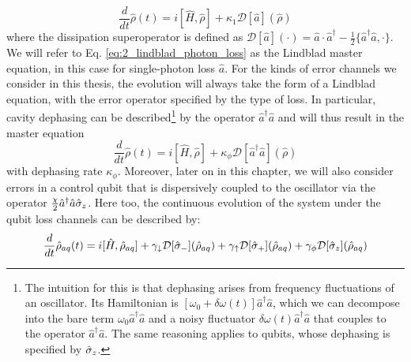 \begin{equation}
    \frac{d}{dt}\hat{\rho}(t) = i[\hat{H}, \hat{\rho}] + \kappa_1\mathcal{D}[\hat{a}](\hat{\rho})
    \label{eq:2_lindblad_photon_loss}
\end{equation}
where the dissipation superoperator is defined as $\mathcal{D}[\hat{a}](\cdot) = \hat{a}\cdot\hat{a}^\dagger - \frac{1}{2}\{\hat{a}^\dagger\hat{a}, \cdot\}$. We will refer to Eq. \eqref{eq:2_lindblad_photon_loss} as the Lindblad master equation, in this case for single-photon loss $\hat{a}$. For the kinds of error channels we consider in this thesis, the evolution will always take the form of a Lindblad equation, with the error operator specified by the type of loss. In particular, cavity dephasing can be described\footnote{The intuition for this is that dephasing arises from frequency fluctuations of an oscillator. Its Hamiltonian is $[\omega_0 + \delta \omega(t)]\hat{a}^\dagger\hat{a}$, which we can decompose into the bare term $\omega_0 \hat{a}^\dagger\hat{a}$ and a noisy fluctuator $\delta \omega(t)\hat{a}^\dagger\hat{a}$ that couples to the operator $\hat{a}^\dagger\hat{a}$. The same reasoning applies to qubits, whose dephasing is specified by $\hat{\sigma}_z$.} by the operator $\hat{a}^\dagger\hat{a}$ and will thus result in the master equation 
\begin{equation}
    \frac{d}{dt}\hat{\rho}(t) = i[\hat{H}, \hat{\rho}] + \kappa_\phi\mathcal{D}[\hat{a}^\dagger\hat{a}](\hat{\rho})
\end{equation}
with dephasing rate $\kappa_\phi$. Moreover, later on in this chapter, we will also consider errors in a control qubit that is dispersively coupled to the oscillator via the operator $\frac{\chi}{2}\hat{a}^\dagger\hat{a}\hat{\sigma}_z$. Here too, the continuous evolution of the system under the qubit loss channels can be described by:
\begin{equation}
    \frac{d}{dt}\hat{\rho}_{aq}(t) = i[\hat{H}, \hat{\rho}_{aq}] + \gamma_\downarrow\mathcal{D}[\hat{\sigma}_-](\hat{\rho}_{aq}) + \gamma_\uparrow\mathcal{D}[\hat{\sigma}_+](\hat{\rho}_{aq}) + \gamma_\phi\mathcal{D}[\hat{\sigma}_z](\hat{\rho}_{aq})
\end{equation}

